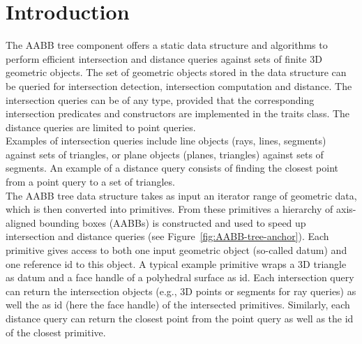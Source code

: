 \section{Introduction}
\label{AABB_tree_section_intro}

The AABB tree component offers a static data structure and algorithms to perform efficient intersection and distance queries against sets of finite 3D geometric objects. The set of geometric objects stored in the data structure can be queried for intersection detection, intersection computation and distance. The intersection queries can be of any type, provided that the corresponding intersection predicates and constructors are implemented in the traits class. The distance queries are limited to point queries.\\

Examples of intersection queries include line objects (rays, lines, segments) against sets of triangles, or plane objects (planes, triangles) against sets of segments. An example of a distance query consists of finding the closest point from a point query to a set of triangles.\\

The AABB tree data structure takes as input an iterator range of geometric data, which is then converted into primitives. From these primitives a hierarchy of axis-aligned bounding boxes (AABBs) is constructed and used to speed up intersection and distance queries (see Figure~\ref{fig:AABB-tree-anchor}). 
Each primitive gives access to both one input geometric object (so-called datum) and one reference id to this object. A typical example primitive wraps a 3D triangle as datum and a face handle of a polyhedral surface as id. Each intersection query can return the intersection objects (e.g., 3D points or segments for ray queries) as well the as id (here the face handle) of the intersected primitives. Similarly, each distance query can return the closest point from the point query as well as the id of the closest primitive. 

